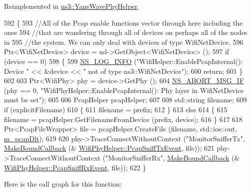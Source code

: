Reimplemented in \hyperlink{classns3_1_1YansWavePhyHelper_a6bcc70f08dc2e44676089f334c4345b0}{ns3\+::\+Yans\+Wave\+Phy\+Helper}.


\begin{DoxyCode}
592 \{
593   \textcolor{comment}{//All of the Pcap enable functions vector through here including the ones}
594   \textcolor{comment}{//that are wandering through all of devices on perhaps all of the nodes in}
595   \textcolor{comment}{//the system. We can only deal with devices of type WifiNetDevice.}
596   Ptr<WifiNetDevice> device = nd->GetObject<WifiNetDevice> ();
597   \textcolor{keywordflow}{if} (device == 0)
598     \{
599       \hyperlink{group__logging_gafbd73ee2cf9f26b319f49086d8e860fb}{NS\_LOG\_INFO} (\textcolor{stringliteral}{"WifiHelper::EnablePcapInternal(): Device "} << &device << \textcolor{stringliteral}{" not of type
       ns3::WifiNetDevice"});
600       \textcolor{keywordflow}{return};
601     \}
602 
603   Ptr<WifiPhy> phy = device->GetPhy ();
604   \hyperlink{group__fatal_ga6653324225bc139e46deea177614ceee}{NS\_ABORT\_MSG\_IF} (phy == 0, \textcolor{stringliteral}{"WifiPhyHelper::EnablePcapInternal(): Phy layer in
       WifiNetDevice must be set"});
605 
606   PcapHelper pcapHelper;
607 
608   std::string filename;
609   \textcolor{keywordflow}{if} (explicitFilename)
610     \{
611       filename = prefix;
612     \}
613   \textcolor{keywordflow}{else}
614     \{
615       filename = pcapHelper.GetFilenameFromDevice (prefix, device);
616     \}
617 
618   Ptr<PcapFileWrapper> file = pcapHelper.CreateFile (filename, std::ios::out, 
      \hyperlink{classns3_1_1WifiPhyHelper_a5d28515f3c747bf279568538546bb2a2}{m\_pcapDlt});
619 
620   phy->TraceConnectWithoutContext (\textcolor{stringliteral}{"MonitorSnifferTx"}, \hyperlink{group__makeboundcallback_ga1725d6362e6065faa0709f7c93f8d770}{MakeBoundCallback} (&
      \hyperlink{classns3_1_1WifiPhyHelper_a24e075fa55e473c81f76a4178c0fcb25}{WifiPhyHelper::PcapSniffTxEvent}, file));
621   phy->TraceConnectWithoutContext (\textcolor{stringliteral}{"MonitorSnifferRx"}, \hyperlink{group__makeboundcallback_ga1725d6362e6065faa0709f7c93f8d770}{MakeBoundCallback} (&
      \hyperlink{classns3_1_1WifiPhyHelper_ac5da2b1210868b0ae050e3adc54a9d2f}{WifiPhyHelper::PcapSniffRxEvent}, file));
622 \}
\end{DoxyCode}


Here is the call graph for this function\+:


